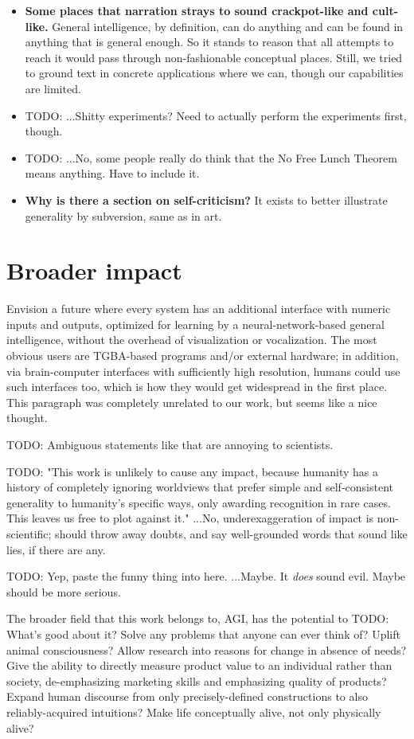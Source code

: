 \documentclass{article}
\begin{document}
\begin{itemize}
\item \textbf{Some places that narration strays to sound crackpot-like and cult-like.} General intelligence, by definition, can do anything and can be found in anything that is general enough. So it stands to reason that all attempts to reach it would pass through non-fashionable conceptual places. Still, we tried to ground text in concrete applications where we can, though our capabilities are limited.
\item TODO: ...Shitty experiments? Need to actually perform the experiments first, though.
\item TODO: ...No, some people really do think that the No Free Lunch Theorem means anything. Have to include it.
\item \textbf{Why is there a section on self-criticism?} It exists to better illustrate generality by subversion, same as in art.
\end{itemize}

\section{Broader impact}

Envision a future where every system has an additional interface with numeric inputs and outputs, optimized for learning by a neural-network-based general intelligence, without the overhead of visualization or vocalization. The most obvious users are TGBA-based programs and/or external hardware; in addition, via brain-computer interfaces with sufficiently high resolution, humans could use such interfaces too, which is how they would get widespread in the first place. This paragraph was completely unrelated to our work, but seems like a nice thought.

    TODO: Ambiguous statements like that are annoying to scientists.

    TODO: "This work is unlikely to cause any impact, because humanity has a history of completely ignoring worldviews that prefer simple and self-consistent generality to humanity's specific ways, only awarding recognition in rare cases. This leaves us free to plot against it." ...No, underexaggeration of impact is non-scientific; should throw away doubts, and say well-grounded words that sound like lies, if there are any.

    TODO: Yep, paste the funny thing into here. ...Maybe. It \textit{does} sound evil. Maybe should be more serious.

The broader field that this work belongs to, AGI, has the potential to TODO: What's good about it? Solve any problems that anyone can ever think of? Uplift animal consciousness? Allow research into reasons for change in absence of needs? Give the ability to directly measure product value to an individual rather than society, de-emphasizing marketing skills and emphasizing quality of products? Expand human discourse from only precisely-defined constructions to also reliably-acquired intuitions? Make life conceptually alive, not only physically alive?
\end{document}
